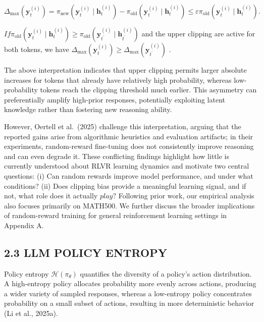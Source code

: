 \documentclass[
  10
]{article}
\begin{document}
\[
\Delta_ {\mathrm{max}} (\mathbf {y} _ {t} ^ {(i)}) = \pi_ {\mathrm{new}} (\mathbf {y} _ {t} ^ {(i)} \mid \mathbf {h} _ {t} ^ {(i)}) - \pi_ {\mathrm{old}} (\mathbf {y} _ {t} ^ {(i)} \mid \mathbf {h} _ {t} ^ {(i)}) \leq \varepsilon \pi_ {\mathrm{old}} (\mathbf {y} _ {t} ^ {(i)} \mid \mathbf {h} _ {t} ^ {(i)}).
\]

\(I f \pi _ { \mathrm { o l d } } ( \mathbf { y } _ { t } ^ { ( i ) } \mid \mathbf { h } _ { t } ^ { ( i ) } ) \geq \pi _ { \mathrm { o l d } } ( \mathbf { y } _ { t ^ { \prime } } ^ { ( i ) } \mid \mathbf { h } _ { t ^ { \prime } } ^ { ( i ) } )\)
and the upper clipping are active for both tokens, we have
\(\Delta _ { \mathrm { m a x } } ( \mathbf { y } _ { t } ^ { ( i ) } ) \geq \Delta _ { \mathrm { m a x } } ( \mathbf { y } _ { t ^ { \prime } } ^ { ( i ) } )\)
.

The above interpretation indicates that upper clipping permits larger
absolute increases for tokens that already have relatively high
probability, whereas low-probability tokens reach the clipping threshold
much earlier. This asymmetry can preferentially amplify high-prior
responses, potentially exploiting latent knowledge rather than fostering
new reasoning ability.

However, Oertell et al.~(2025) challenge this interpretation, arguing
that the reported gains arise from algorithmic heuristics and evaluation
artifacts; in their experiments, random-reward fine-tuning does not
consistently improve reasoning and can even degrade it. These
conflicting findings highlight how little is currently understood about
RLVR learning dynamics and motivate two central questions: (i) Can
random rewards improve model performance, and under what conditions?
(ii) Does clipping bias provide a meaningful learning signal, and if
not, what role does it actually \(p l a y ?\) Following prior work, our
empirical analysis also focuses primarily on MATH500. We further discuss
the broader implications of random-reward training for general
reinforcement learning settings in Appendix A.

\subsection{2.3 LLM POLICY ENTROPY}\label{llm-policy-entropy}

Policy entropy \(\mathcal { H } ( \pi _ { \theta } )\) quantifies the
diversity of a policy's action distribution. A high-entropy policy
allocates probability more evenly across actions, producing a wider
variety of sampled responses, whereas a low-entropy policy concentrates
probability on a small subset of actions, resulting in more
deterministic behavior (Li et al., 2025a).
\end{document}
